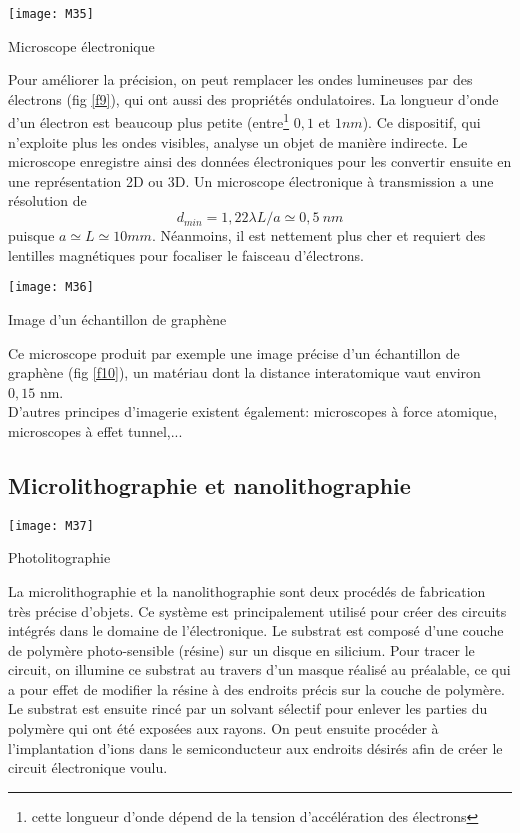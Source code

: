 \begin{marginfigure}[-1cm]
\texttt{[image: M35]}
\caption{Microscope électronique}
\label{f9}
\end{marginfigure}

Pour améliorer la précision, on peut remplacer les ondes lumineuses par des électrons (fig \ref{f9}), qui ont aussi des propriétés ondulatoires. La longueur d'onde d'un électron est beaucoup plus petite (entre\footnote{cette longueur d'onde dépend de la tension d'accélération des électrons} $0,1$ et $1nm$). Ce dispositif, qui n'exploite plus les ondes visibles, analyse un objet de manière indirecte. Le microscope enregistre ainsi des données électroniques pour les convertir ensuite en une représentation 2D ou 3D. Un microscope électronique à transmission a une résolution de $$d_{min}=1,22\lambda L/a\simeq0,5\:nm$$ puisque $a\simeq L\simeq10mm$.
Néanmoins, il est nettement plus cher et requiert des lentilles magnétiques pour focaliser le faisceau d'électrons.\\

\begin{marginfigure}[0cm]
\texttt{[image: M36]}
\caption{Image d'un échantillon de graphène}
\label{f10}
\end{marginfigure}

\noindent Ce microscope produit par exemple une image précise d'un échantillon de graphène (fig \ref{f10}), un matériau dont la distance interatomique vaut environ $0,15$ nm.\\

\noindent D'autres principes d'imagerie existent également: microscopes à force atomique, microscopes à effet tunnel,...

\subsection{Microlithographie et nanolithographie}

\begin{marginfigure}[0cm]
\texttt{[image: M37]}
\caption{Photolitographie}
\label{f11}
\end{marginfigure}

La microlithographie et la nanolithographie sont deux procédés de fabrication très précise d'objets. Ce système est principalement utilisé pour créer des circuits intégrés dans le domaine de l'électronique. Le substrat est composé d'une couche de polymère photo-sensible (résine) sur un disque en silicium. Pour tracer le circuit, on illumine ce substrat au travers d'un masque réalisé au préalable, ce qui a pour effet de modifier la résine à des endroits précis sur la couche de polymère. Le substrat est ensuite rincé par un solvant sélectif pour enlever les parties du polymère qui ont été exposées aux rayons. On peut ensuite procéder à l'implantation d'ions dans le semiconducteur aux endroits désirés afin de créer le circuit électronique voulu. 

